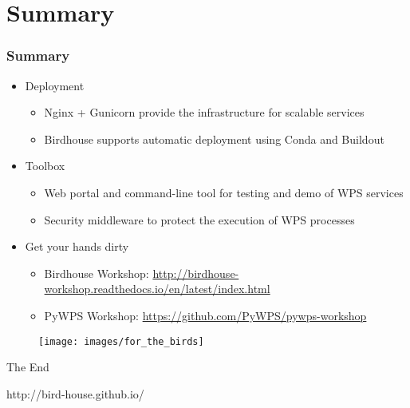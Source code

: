\documentclass{beamer}
\begin{document}
\section{Summary}

\begin{frame}
\frametitle<presentation>{Summary}

\begin{itemize}

  \item Deployment
  \begin{itemize}
    \item Nginx + Gunicorn provide the infrastructure for scalable services
    \item Birdhouse supports automatic deployment using Conda and Buildout
  \end{itemize}

  \item{Toolbox}
  \begin{itemize}
    \item Web portal and command-line tool for testing and demo of WPS services
    \item Security middleware to protect the execution of WPS processes
  \end{itemize}

  \item{Get your hands dirty}
  \begin{itemize}
    \item Birdhouse Workshop: \url{http://birdhouse-workshop.readthedocs.io/en/latest/index.html}
    \item PyWPS Workshop: \url{https://github.com/PyWPS/pywps-workshop}
  \end{itemize}
\end{itemize}

\end{frame}

\begin{frame}

  \begin{figure}[ht]
   \centering
   \texttt{[image: images/for\_the\_birds]}
  \end{figure}

\centering
\Huge{The End}

\vspace{0.4cm}
\normalsize{http://bird-house.github.io/}
\end{frame}
\end{document}
